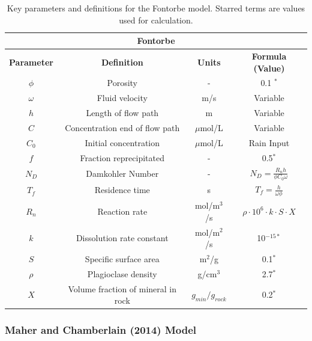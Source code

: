 \begin{table}[H]
    \centering
    \renewcommand{\arraystretch}{1.3} %
    \begin{tabular}{|c|c|c|c|}
        \hline
        \multicolumn{4}{|c|}{\textbf{Fontorbe}} \\  
        \hline
        \textbf{Parameter} & \textbf{Definition} & \textbf{Units} & \textbf{Formula (Value)} \\  
        \hline
        $\phi$ & Porosity & - & 0.1 $^*$\\
        $\omega$ & Fluid velocity & m/s & Variable \\
        $h$ & Length of flow path & m & Variable \\
        $C$ & Concentration \@ end of flow path & $\mu$mol/L & Variable \\
        $C_0$ & Initial concentration & $\mu$mol/L & Rain Input \\
        $f$ & Fraction reprecipitated & - & 0.5$^*$ \\
        $N_D$ & Damkohler Number & - & $N_D = \frac{R_n h}{\phi C_0 \omega}$ \\
        $T_f$ & Residence time & s & $T_f = \frac{h}{\omega\phi}$ \\
        $R_n$ & Reaction rate & mol/m$^3$/s & $\rho \cdot 10^6 \cdot k \cdot S \cdot X $ \\
        $k$ & Dissolution rate constant & mol/m$^2$/s & 10$^{-15*}$ \\
        $S$ & Specific surface area & m$^2$/g & 0.1$^*$ \\
        $\rho$ & Plagioclase density & g/cm$^3$ & 2.7$^*$ \\
        $X$ & Volume fraction of mineral in rock & $g_{min}/g_{rock}$ & 0.2$^*$ \\
        \hline
    \end{tabular}
    \caption{Key parameters and definitions for the Fontorbe model. Starred terms are values used for calculation.}
    \label{tab:fontorbe1}
\end{table}


\FloatBarrier









\newpage




\subsubsection*{Maher and Chamberlain (2014) Model}

